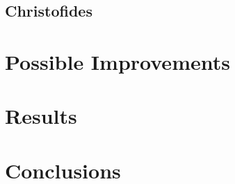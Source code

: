 \documentclass[midd]{thesis}
\begin{document}
\section{Christofides}

\chapter{Possible Improvements}
\chapter{Results}
\chapter{Conclusions}


\end{document}
